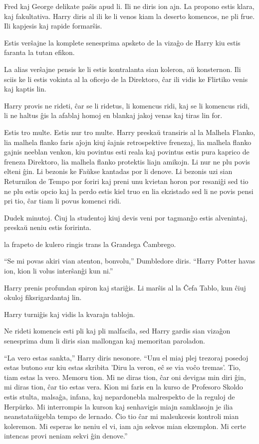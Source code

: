 Fred kaj George delikate paŝis apud li. Ili ne diris ion ajn. La
propono estis klara, kaj fakultativa. Harry diris al ili ke li venos
kiam la deserto komencos, ne pli frue. Ili kapjesis kaj rapide
formarŝis.

Estis verŝajne la komplete senesprima apsketo de la vizaĝo de Harry kiu estis faranta la tutan efikon.

La alias verŝajne pensis ke li estis kontralanta sian koleron, aŭ
konsternon. Ili sciis ke li estis vokinta al la oficejo de la
Direktoro, ĉar ili vidis ke Flirtiko venis kaj kaptis lin.

Harry provis ne rideti, ĉar se li ridetus, li komencus ridi, kaj se li
komencus ridi, li ne haltus ĝis la afablaj homoj en blankaj jakoj
venas kaj tiras lin for.

Estis tro multe. Estis nur tro multe. Harry preskaŭ transiris al la
Malhela Flanko, lia malhela flanko faris aĵojn kiuj ŝajnis
retrospektive frenezaj, lia malhela flanko gajnis neeblan venkon, kiu
povintus esti reala kaj povintus estis pura kaprico de freneza
Direktoro, lia malhela flanko protektis liajn amikojn. Li nur ne plu
povis elteni ĝin. Li bezonis ke Faŭkse kantadas por li denove. Li
bezonis uzi sian Returnilon de Tempo por foriri kaj preni unu kvietan
horon por resaniĝi sed tio ne plu estis opcio kaj la perdo estis kiel
truo en lia ekzistado sed li ne povis pensi pri tio, ĉar tiam li povus
komenci ridi.

Dudek minutoj. Ĉiuj la studentoj kiuj devis veni por tagmanĝo estis
alvenintaj, preskaŭ neniu estis foririnta.

la frapeto de kulero ringis trans la Grandega Ĉambrego.

``Se mi povas akiri vian atenton, bonvolu,'' Dumbledore diris. ``Harry
Potter havas ion, kion li volus interŝanĝi kun ni.''

Harry prenis profundan spiron kaj stariĝis. Li marŝis al la Ĉefa
Tablo, kun ĉiuj okuloj fiksrigardantaj lin.

Harry turniĝis kaj vidis la kvarajn tablojn.

Ne rideti komencis esti pli kaj pli malfacila, sed Harry gardis sian
vizaĝon senesprima dum li diris sian mallongan kaj memoritan paroladon.

``La vero estas sankta,'' Harry diris nesonore. ``Unu el miaj plej
trezoraj posedoj estas butono sur kiu estas skribita 'Diru la veron,
eĉ se via voĉo tremas'. Tio, tiam estas la vero. Memoru tion. Mi ne
diras tion, ĉar oni devigas min diri ĝin, mi diras tion, ĉar tio
estas vera.  Kion mi faris en la kurso de Profesoro Skoldo estis
stulta, malsaĝa, infana, kaj nepardonebla malrespekto de la reguloj de
Herpŭrko. Mi interrompis la kurson kaj senhavigis miajn samklasojn je
ilia neanstataŭigebla tempo de lernado. Ĉio tio ĉar mi malsukcesis
kontroli mian koleremon. Mi esperas ke neniu el vi, iam ajn sekvos
mian ekzemplon. Mi certe intencas provi neniam sekvi ĝin denove.''

